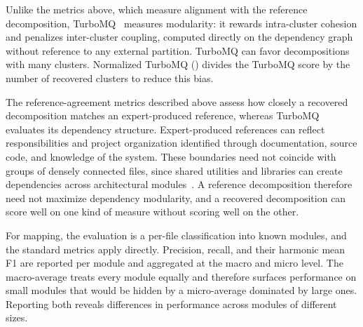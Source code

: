 Unlike the metrics above, which measure alignment with the reference decomposition, TurboMQ~\cite{turbomq} measures modularity: it rewards intra-cluster cohesion and penalizes inter-cluster coupling, computed directly on the dependency graph without reference to any external partition. TurboMQ can favor decompositions with many clusters. Normalized TurboMQ (\tmq{}) divides the TurboMQ score by the number of recovered clusters to reduce this bias.

The reference-agreement metrics described above assess how closely a recovered decomposition matches an expert-produced reference, whereas TurboMQ evaluates its dependency structure. Expert-produced references can reflect responsibilities and project organization identified through documentation, source code, and knowledge of the system. These boundaries need not coincide with groups of densely connected files, since shared utilities and libraries can create dependencies across architectural modules~\cite{garcia2013}. A reference decomposition therefore need not maximize dependency modularity, and a recovered decomposition can score well on one kind of measure without scoring well on the other.

For mapping, the evaluation is a per-file classification into known modules, and the standard metrics apply directly. Precision, recall, and their harmonic mean F1 are reported per module and aggregated at the macro and micro level. The macro-average treats every module equally and therefore surfaces performance on small modules that would be hidden by a micro-average dominated by large ones. Reporting both reveals differences in performance across modules of different sizes.
